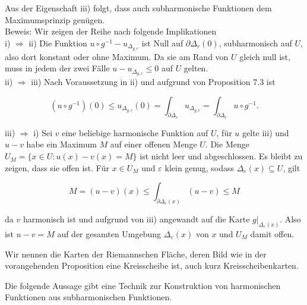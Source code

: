 \documentclass[10pt, letterpaper]{article}
\begin{document}
Aus der Eigenschaft iii) folgt, dass auch subharmonische Funktionen dem Maximumsprinzip genügen.\\
Beweis: Wir zeigen der Reihe nach folgende Implikationen\\
i) $\Rightarrow$ ii) Die Funktion $u \circ g^{-1}-u_{\Delta_{g, r}}$ ist Null auf $\partial \Delta_{r}(0)$, subharmonisch auf $U$, also dort konstant oder ohne Maximum. Da sie am Rand von $U$ gleich null ist, muss in jedem der zwei Fälle $u-u_{\Delta_{g, r}} \leq 0$ auf $U$ gelten.\\
ii) $\Rightarrow$ iii) Nach Voraussetzung in ii) und aufgrund von Proposition 7.3 ist

$$
\left(u \circ g^{-1}\right)(0) \leq u_{\Delta_{g, r}}(0)=\int_{\partial \Delta_{r}} u_{\Delta_{g, r}}=\int_{\partial \Delta_{r}} u \circ g^{-1} .
$$

iii) $\Rightarrow$ i) Sei $v$ eine beliebige harmonische Funktion auf $U$, für $u$ gelte iii) und $u-v$ habe ein Maximum $M$ auf einer offenen Menge $U$. Die Menge $U_{M}=\{x \in U: u(x)-v(x)=M\}$ ist nicht leer und abgeschlossen. Es bleibt zu zeigen, dass sie offen ist. Für $x \in U_{M}$ und $\varepsilon$ klein genug, sodass $\Delta_{\varepsilon}(x) \subseteq U$, gilt

$$
M=(u-v)(x) \leq \int_{\partial \Delta_{\varepsilon}(x)}(u-v) \leq M
$$

da $v$ harmonisch ist und aufgrund von iii) angewandt auf die Karte $\left.g\right|_{\Delta_{\varepsilon}(x)}$. Also ist $u-v=M$ auf der gesamten Umgebung $\Delta_{\varepsilon}(x)$ von $x$ und $U_{M}$ damit offen.

Wir nennen die Karten der Riemannschen Fläche, deren Bild wie in der vorangehenden Proposition eine Kreisscheibe ist, auch kurz Kreisscheibenkarten.

Die folgende Aussage gibt eine Technik zur Konstruktion von harmonischen Funktionen aus subharmonischen Funktionen.
\end{document}
